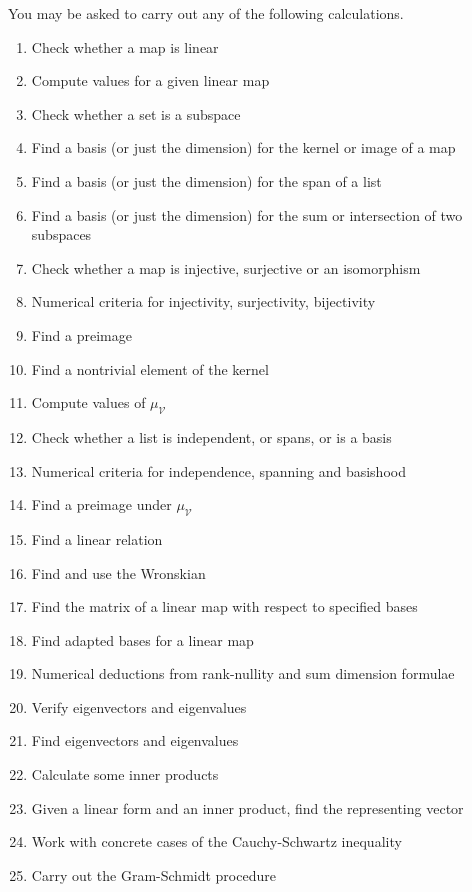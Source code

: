 \documentclass{amsart}
\renewcommand{\:}{\colon}
\begin{document}
You may be asked to carry out any of the following calculations. 
\begin{enumerate}
 \item Check whether a map is linear
 \item Compute values for a given linear map
 \item Check whether a set is a subspace
 \item Find a basis (or just the dimension) for the kernel or image of
  a map
 \item Find a basis (or just the dimension) for the span of a list
 \item Find a basis (or just the dimension) for the sum or
  intersection of two subspaces
 \item Check whether a map is injective, surjective or an isomorphism
 \item Numerical criteria for injectivity, surjectivity, bijectivity
 \item Find a preimage
 \item Find a nontrivial element of the kernel
 \item Compute values of $\mu_{\mathcal{V}}$
 \item Check whether a list is independent, or spans, or is a basis
 \item Numerical criteria for independence, spanning and basishood
 \item Find a preimage under $\mu_{\mathcal{V}}$
 \item Find a linear relation
 \item Find and use the Wronskian
 \item Find the matrix of a linear map with respect to specified bases
 \item Find adapted bases for a linear map
 \item Numerical deductions from rank-nullity and sum dimension
  formulae
 \item Verify eigenvectors and eigenvalues
 \item Find eigenvectors and eigenvalues
 \item Calculate some inner products
 \item Given a linear form and an inner product, find the representing vector
 \item Work with concrete cases of the Cauchy-Schwartz inequality
 \item Carry out the Gram-Schmidt procedure
\end{enumerate}
\end{document}
